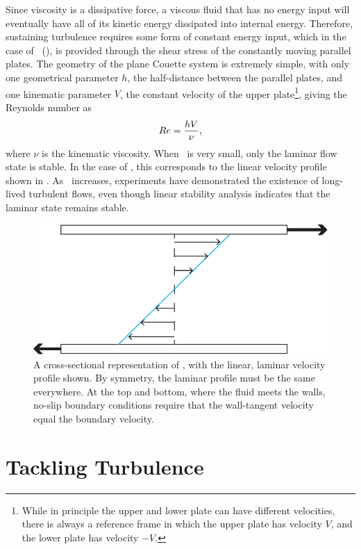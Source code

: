 Since viscosity is a dissipative force, a viscous fluid that has no energy input will eventually have all of its kinetic energy dissipated into internal energy. Therefore, sustaining turbulence requires some form of constant energy input, which in the case of \pCf\ (), is provided through the shear stress of the constantly moving parallel plates. The geometry of the plane Couette system is extremely simple, with only one geometrical parameter $h$, the half-distance between the parallel plates, and one kinematic parameter $V$, the constant velocity of the upper plate\footnote{While in principle the upper and lower plate can have different velocities, there is always a reference frame in which the upper plate has velocity $V$, and the lower plate has velocity $-V$.}, giving the Reynolds number as 
\begin{equation}
Re = \dfrac{hV}{\nu},
\end{equation}
where $\nu$ is the kinematic viscosity. When \ReN~is very small, only the laminar flow state is stable. In the case of \pCf, this corresponds to the linear velocity profile shown in . As \ReN~increases, experiments have demonstrated the existence of long-lived turbulent flows, even though linear stability analysis indicates that the laminar state remains stable.
\begin{figure}
\centerline{
\includegraphics[scale=0.6]{Figs/planeCouetteMeanFlow}}
\caption{A cross-sectional representation of \pCf, with the linear, laminar velocity profile shown. By symmetry, the laminar profile must be the same everywhere. At the top and bottom, where the fluid meets the walls, no-slip boundary conditions require that the wall-tangent velocity equal the boundary velocity.}\label{fig:planeCouetteBulk}
\end{figure}

\section{Tackling Turbulence} 

